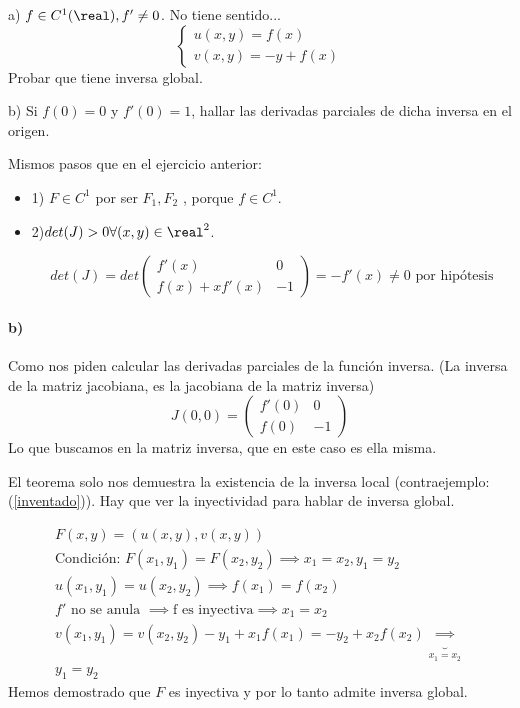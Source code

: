 \documentclass{apuntes}
\begin{document}
 \begin{problem}[5]



 a)
 $f\in C^1(\real), f'\neq0$.
 No tiene sentido...
 $$\left\{\begin{matrix} u(x,y) =f(x)\\v(x,y) = -y + f(x)\end{matrix}\right.$$
 Probar que tiene inversa global.
 
 b) Si $f (0) = 0$ y $f' (0) = 1$, hallar las derivadas parciales de dicha inversa en el origen.

\solution

 Mismos pasos que en el ejercicio anterior:
 \begin{itemize}
 \item 1) $F \in C^1$ por ser $F_1,F_2$ , porque $f\in C^1$.
 \item 2)$det(J)>0 \forall (x,y)\in \real^2$.
 
 $$det(J) = det\begin{pmatrix} f'(x)&0\\f(x)+xf'(x)&-1\end{pmatrix} = -f'(x) \neq 0\text{ por hipótesis}$$
 \end{itemize}
 \paragraph{b)}
 Como nos piden calcular las derivadas parciales de la función inversa. (La inversa de la matriz jacobiana, es la jacobiana de la matriz inversa)
 $$J(0,0) = \begin{pmatrix}f'(0) & 0 \\f(0) & -1\end{pmatrix}$$
 Lo que buscamos en la matriz inversa, que en este caso es ella misma.
 
 El teorema solo nos demuestra la existencia de la inversa local (contraejemplo:(\ref{inventado})). Hay que ver la inyectividad para hablar de inversa global.
 
\begin{gather*}
F(x,y) = (u(x,y),v(x,y))\\
\text{Condición: }F(x_1,y_1) = F(x_2,y_2) \implies x_1=x_2, y_1=y_2\\
u(x_1,y_1) = u(x_2,y_2) \implies f(x_1) = f(x_2)\\
f' \text{ no se anula } \implies \text{f es inyectiva} \implies x_1=x_2\\
v(x_1,y_1) = v(x_2,y_2) -y_1 + x_1f(x_1) = -y_2 + x_2f(x_2) \underbrace{\implies}_{x_1=x_2}\\
y_1=y_2
\end{gather*}
Hemos demostrado que $F$ es inyectiva y por lo tanto admite inversa global.
 
\end{problem}
\end{document}
